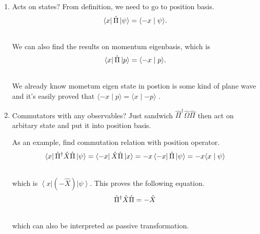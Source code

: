 \documentclass[letterpaper,10pt,english]{sphinxmanual}
\newcommand{\bra}[1]{\left\langle #1\right|}
\newcommand{\ket}[1]{\left| #1\right\rangle}
\newcommand{\braket}[2]{\langle #1 \mid #2 \rangle}
\begin{document}
\begin{enumerate}
\item {} 
Acts on states? From definition, we need to go to position basis.
\begin{gather}
\begin{split}\bra{x}\hat \Pi\ket{\psi}  = \braket{-x}{\psi} .\end{split}\notag\\\begin{split}\end{split}\notag
\end{gather}
We can also find the results on momentum eigenbasis, which is
\begin{gather}
\begin{split}\bra{x}\hat \Pi \ket{p} = \braket{-x}{p}   .\end{split}\notag\\\begin{split}\end{split}\notag
\end{gather}
We already know mometum eigen state in postion is some kind of plane wave and it's easily proved that $\braket{-x}{p} = \braket{x}{-p}$ .

\item {} 
Commutators with any observables? Just sandwich $\hat \Pi^ \dagger \hat \Omega \hat \Pi$ then act on arbitary state and put it into position basis.

As an example, find commutation relation with position operator.
\begin{gather}
\begin{split}\bra{x}\hat \Pi^\dagger \hat X \hat \Pi \ket{\psi} = \bra{ - x}\hat X \hat \Pi\ket{x} = -x \bra{-x}\hat \Pi \ket{\psi} = -x \braket{x}{\psi}\end{split}\notag\\\begin{split}\end{split}\notag
\end{gather}
which is $\bra{x}(-\hat X)\ket{\psi}$. This proves the following equation.
\begin{gather}
\begin{split}\hat \Pi^\dagger \hat X \hat \Pi = -\hat X\end{split}\notag\\\begin{split}\end{split}\notag
\end{gather}
which can also be interpreted as passive transformation.


\end{enumerate}
\end{document}
